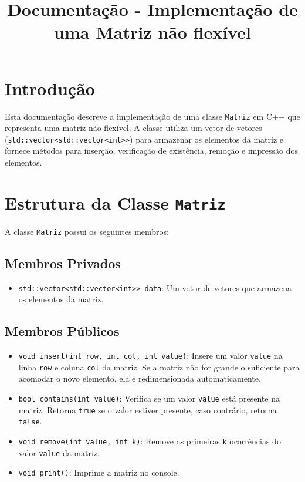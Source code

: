 \documentclass{article}
\title{Documentação - Implementação de uma Matriz não flexível}
\author{}
\date{}
\begin{document}
\maketitle

\section{Introdução}

Esta documentação descreve a implementação de uma classe \texttt{Matriz} em C++ que representa uma matriz não flexível. A classe utiliza um vetor de vetores (\texttt{std::vector<std::vector<int>>}) para armazenar os elementos da matriz e fornece métodos para inserção, verificação de existência, remoção e impressão dos elementos.

\section{Estrutura da Classe \texttt{Matriz}}

A classe \texttt{Matriz} possui os seguintes membros:

\subsection{Membros Privados}

\begin{itemize}
    \item \texttt{std::vector<std::vector<int>> data}: Um vetor de vetores que armazena os elementos da matriz.
\end{itemize}

\subsection{Membros Públicos}

\begin{itemize}
    \item \texttt{void insert(int row, int col, int value)}: Insere um valor \texttt{value} na linha \texttt{row} e coluna \texttt{col} da matriz. Se a matriz não for grande o suficiente para acomodar o novo elemento, ela é redimensionada automaticamente.
    \item \texttt{bool contains(int value)}: Verifica se um valor \texttt{value} está presente na matriz. Retorna \texttt{true} se o valor estiver presente, caso contrário, retorna \texttt{false}.
    \item \texttt{void remove(int value, int k)}: Remove as primeiras \texttt{k} ocorrências do valor \texttt{value} da matriz.
    \item \texttt{void print()}: Imprime a matriz no console.
\end{itemize}
\end{document}
